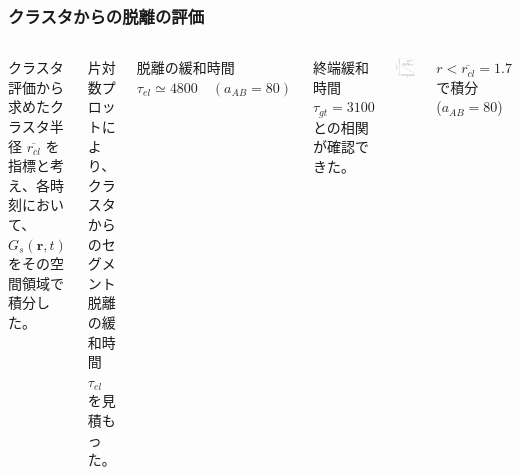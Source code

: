 \documentclass[12pt, dvipdfmx]{beamer}
\begin{document}
\begin{frame}
\frametitle{クラスタからの脱離の評価}

\begin{columns}[T, totalwidth=\linewidth]

クラスタ評価から求めたクラスタ半径 $\overline{r_{cl}}$ を指標と考え、各時刻において、$G_s(\bm{r}, t)$ をその空間領域で積分した。

片対数プロットにより、クラスタからのセグメント脱離の緩和時間 $\tau_{el}$ を見積もった。

\begin{alertblock}{脱離の緩和時間}
		\centering
		$\tau_{el} \simeq 4800 \quad (a_{AB} = 80)$
		\end{alertblock}
終端緩和時間 $\tau_{gt}=3100$ との相関が確認できた。

	\includegraphics[width=\columnwidth]{./fig/AB80/Cuml_data_7.pdf}

\centering
$r<\overline{r_{cl}}=1.7$ で積分\\
($a_{AB} = 80$)
\end{columns}

\end{frame}
\end{document}
